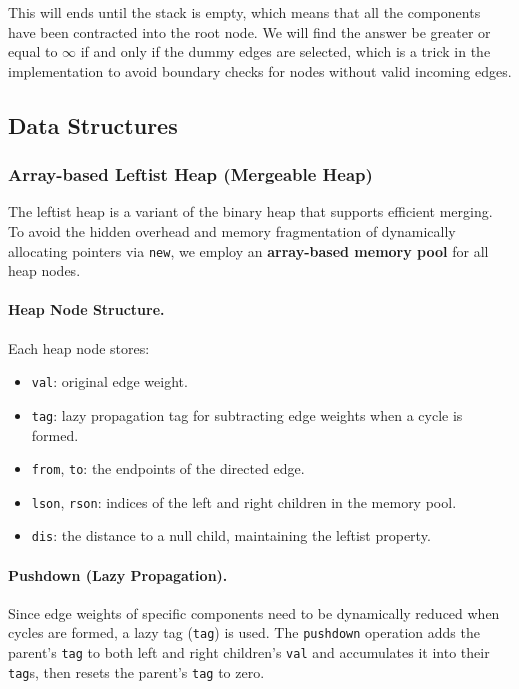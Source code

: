 \documentclass[UTF8, a4paper]{article}
\theoremstyle{definition}
\begin{document}
This will ends until the stack is empty, which means that all the components have been contracted into the root node. 
We will find the answer be greater or equal to $\infty$ if and only if the dummy edges are selected, which is 
a trick in the implementation to avoid boundary checks for nodes without valid incoming edges.

\subsection{Data Structures}

\subsubsection{Array-based Leftist Heap (Mergeable Heap)}

The leftist heap is a variant of the binary heap that supports efficient merging. To avoid the hidden overhead and memory fragmentation of dynamically allocating pointers via \texttt{new}, we employ an \textbf{array-based memory pool} for all heap nodes.

\paragraph{Heap Node Structure.} Each heap node stores:
\begin{itemize}
    \item \texttt{val}: original edge weight.
    \item \texttt{tag}: lazy propagation tag for subtracting edge weights when a cycle is formed.
    \item \texttt{from}, \texttt{to}: the endpoints of the directed edge.
    \item \texttt{lson}, \texttt{rson}: indices of the left and right children in the memory pool.
    \item \texttt{dis}: the distance to a null child, maintaining the leftist property.
\end{itemize}

\paragraph{Pushdown (Lazy Propagation).} Since edge weights of specific components need to be dynamically reduced when cycles are formed, a lazy tag (\texttt{tag}) is used. The \texttt{pushdown} operation adds the parent's \texttt{tag} to both left and right children's \texttt{val} and accumulates it into their \texttt{tag}s, then resets the parent's \texttt{tag} to zero.
\end{document}
